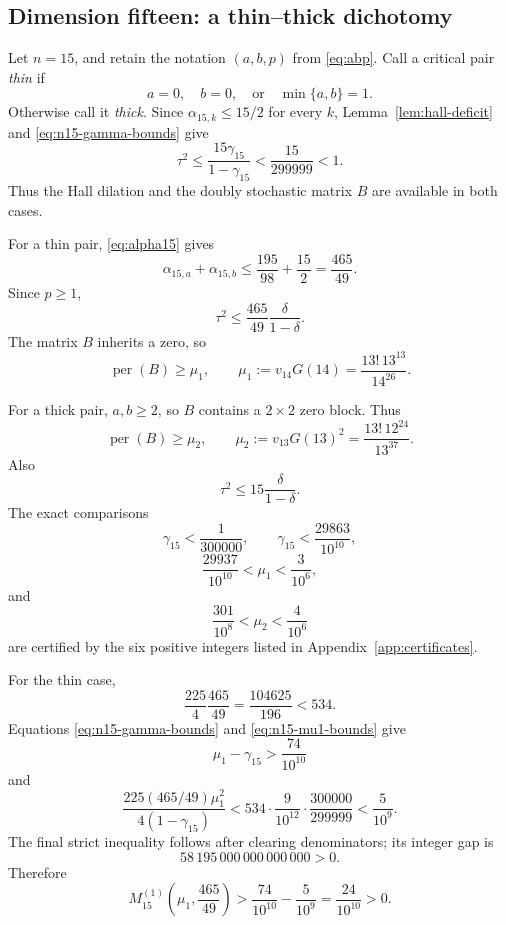 \documentclass[11pt,a4paper]{article}
\numberwithin{equation}{section}
\theoremstyle{definition}
\newcommand{\per}{\operatorname{per}}
\newcommand{\1}{\mathbf{1}}
\begin{document}
\subsection{Dimension fifteen: a thin--thick dichotomy}

Let $n=15$, and retain the notation $(a,b,p)$ from \eqref{eq:abp}.  Call a critical pair \emph{thin} if
\[
 a=0,
 \quad b=0,
 \quad\text{or}\quad
 \min\{a,b\}=1.
\]
Otherwise call it \emph{thick}.  Since $\alpha_{15,k}\le15/2$ for every $k$, Lemma~\ref{lem:hall-deficit} and \eqref{eq:n15-gamma-bounds} give
\[
 \tau^2\le\frac{15\gamma_{15}}{1-\gamma_{15}}
 <\frac{15}{299999}<1.
\]
Thus the Hall dilation and the doubly stochastic matrix $B$ are available in both cases.

For a thin pair, \eqref{eq:alpha15} gives
\[
 \alpha_{15,a}+\alpha_{15,b}
 \le\frac{195}{98}+\frac{15}{2}
 =\frac{465}{49}.
\]
Since $p\ge1$,
\begin{equation}\label{eq:n15-thin-tau}
 \tau^2\le\frac{465}{49}\frac{\delta}{1-\delta}.
\end{equation}
The matrix $B$ inherits a zero, so
\begin{equation}\label{eq:mu1}
 \per(B)\ge\mu_1,
 \qquad
 \mu_1:=v_{14}G(14)
 =\frac{13!\,13^{13}}{14^{26}}.
\end{equation}

For a thick pair, $a,b\ge2$, so $B$ contains a $2\times2$ zero block.  Thus
\begin{equation}\label{eq:mu2}
 \per(B)\ge\mu_2,
 \qquad
 \mu_2:=v_{13}G(13)^2
 =\frac{13!\,12^{24}}{13^{37}}.
\end{equation}
Also
\begin{equation}\label{eq:n15-thick-tau}
 \tau^2\le15\frac{\delta}{1-\delta}.
\end{equation}
The exact comparisons
\begin{equation}\label{eq:n15-gamma-bounds}
 \gamma_{15}<\frac1{300000},
 \qquad
 \gamma_{15}<\frac{29863}{10^{10}},
\end{equation}
\begin{equation}\label{eq:n15-mu1-bounds}
 \frac{29937}{10^{10}}<\mu_1<\frac3{10^6},
\end{equation}
and
\begin{equation}\label{eq:n15-mu2-bounds}
 \frac{301}{10^8}<\mu_2<\frac4{10^6}
\end{equation}
are certified by the six positive integers listed in Appendix~\ref{app:certificates}.

For the thin case,
\[
 \frac{225}{4}\frac{465}{49}
 =\frac{104625}{196}<534.
\]
Equations \eqref{eq:n15-gamma-bounds} and \eqref{eq:n15-mu1-bounds} give
\[
 \mu_1-\gamma_{15}>\frac{74}{10^{10}}
\]
and
\[
 \frac{225(465/49)\mu_1^2}{4(1-\gamma_{15})}
 <534\cdot\frac9{10^{12}}\cdot\frac{300000}{299999}
 <\frac5{10^9}.
\]
The final strict inequality follows after clearing denominators; its integer gap is
\[
 58\,195\,000\,000\,000\,000>0.
\]
Therefore
\begin{equation}\label{eq:n15-thin-margin}
 M_{15}^{(1)}\left(\mu_1,\frac{465}{49}\right)
 >\frac{74}{10^{10}}-\frac5{10^9}
 =\frac{24}{10^{10}}>0.
\end{equation}
\end{document}
